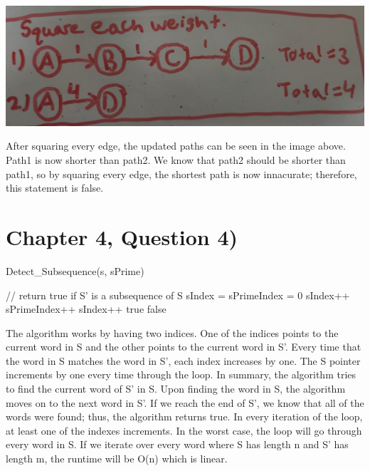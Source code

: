 \documentclass[11pt]{article}
\begin{document}
\begin{center}
\includegraphics[keepaspectratio=true,scale=0.25]{updated_paths2.jpg}
\end{center}
After squaring every edge, the updated paths can be seen in the image above. Path1 is now shorter than path2. We know that path2 should be shorter than path1, so by squaring every edge, the shortest path is now innacurate; therefore, this statement is false.

\section{Chapter 4, Question 4)}
\begin{algorithm}[H]
\caption{Detect\_Subsequence(s, sPrime)}
\begin{algorithmic} 
\STATE // return true if S' is a subsequence of S
\STATE sIndex = sPrimeIndex = 0
\STATE sIndex++
\STATE sPrimeIndex++
\ELSE
\STATE sIndex++
\ENDIF
\ENDWHILE
{}
\RETURN true
\ENDIF
\RETURN false
\end{algorithmic}
\end{algorithm}

The algorithm works by having two indices. One of the indices points to the current word in S and the other points to the current word in S'. Every time that the word in S matches the word in S', each index increases by one. The S pointer increments by one every time through the loop. In summary, the algorithm tries to find the current word of S' in S. Upon finding the word in S, the algorithm moves on to the next word in S'. If we reach the end of S', we know that all of the words were found; thus, the algorithm returns true.
\newline
In every iteration of the loop, at least one of the indexes increments. In the worst case, the loop will go through every word in S. If we iterate over every word where S has length n and S' has length m, the runtime will be O(n) which is linear.
\end{document}
